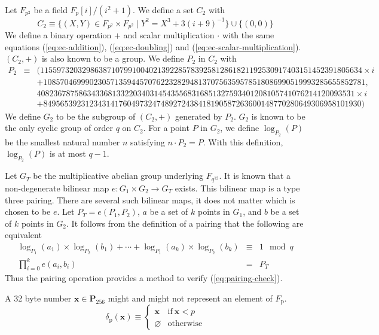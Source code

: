 \documentclass[9pt,oneside]{amsart}
\begin{document}
Let $F_{p^2}$ be a field $F_{p}[i]/(i^2+1)$. We define a set $C_2$ with
\begin{equation}
C_2\equiv\{(X,Y)\in F_{p^2}\times F_{p^2}\mid Y^2=X^3+3(i+9)^{-1}\}\cup\{(0,0)\}
\end{equation}
We define a binary operation $+$ and scalar multiplication $\cdot$ with the same equations (\ref{eq:ec-addition}), (\ref{eq:ec-doubling}) and (\ref{eq:ec-scalar-multiplication}). $(C_2,+)$ is also known to be a group. We define $P_2$ in $C_2$ with
\begin{eqnarray}
P_2&\equiv&
(11559732032986387107991004021392285783925812861821192530917403151452391805634 \times i\\\nonumber &&+ 10857046999023057135944570762232829481370756359578518086990519993285655852781,\\\nonumber && 4082367875863433681332203403145435568316851327593401208105741076214120093531 \times i\\\nonumber &&+ 8495653923123431417604973247489272438418190587263600148770280649306958101930)
\end{eqnarray}
We define $G_2$ to be the subgroup of $(C_2,+)$ generated by $P_2$. $G_2$ is known to be the only cyclic group of order $q$ on $C_2$. For a point $P$ in $G_2$, we define $\log_{P_2}(P)$ be the smallest natural number $n$ satisfying $n\cdot P_2=P$. With this definition, $\log_{P_2}(P)$ is at most $q-1$.

Let $G_T$ be the multiplicative abelian group underlying $F_{q^{12}}$. It is known that a non-degenerate bilinear map $e : G_1\times G_2 \to G_T$ exists. This bilinear map is a type three pairing. There are several such bilinear maps, it does not matter which is chosen to be $e$.
Let $P_T = e(P_1, P_2)$, $a$ be a set of $k$ points in $G_1$, and $b$ be a set of $k$ points in $G_2$. It follows from the definition of a pairing that the following are equivalent
\begin{eqnarray} \label{eq:pairing-check}
\log_{P_1}(a_1)\times\log_{P_2}(b_1)+\cdots+\log_{P_1}(a_{k})\times\log_{P_2}(b_{k})&\equiv& 1\mod q\\
\prod_{i=0}^{k}e\left(a_i, b_i\right) &=& P_T
\end{eqnarray}
Thus the pairing operation provides a method to verify (\ref{eq:pairing-check}).

A 32 byte number $\mathbf{x}\in\mathbf{P}_{256}$ might and might not represent an element of $F_{\mathrm{p}}$.
\begin{equation}
\delta_{\mathrm{p}}(\mathbf{x})\equiv\begin{cases}
\mathbf{x}&\text{if}\ \mathbf{x}<p\\
\varnothing&\text{otherwise}
\end{cases}
\end{equation}
\end{document}
